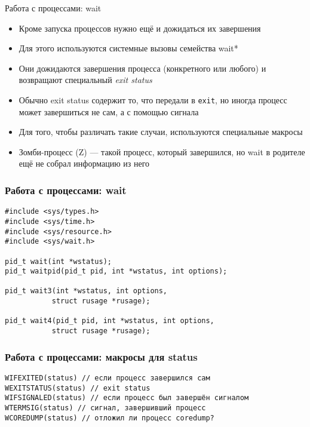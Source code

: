 \documentclass[10pt,pdf,hyperref={unicode}]{beamer}
\begin{document}
\begin{frame}{Работа с процессами: wait}
\begin{itemize}
    \item Кроме запуска процессов нужно ещё и дожидаться их завершения
    \item Для этого используются системные вызовы семейства wait*
    \item Они дожидаются завершения процесса (конкретного или любого) и возвращают специальный \emph{exit status}
    \item Обычно exit status содержит то, что передали в \texttt{exit}, но иногда процесс может завершиться не сам, а с помощью сигнала
    \item Для того, чтобы различать такие случаи, используются специальные макросы
    \item Зомби-процесс (Z) — такой процесс, который завершился, но wait в родителе ещё не собрал информацию из него
\end{itemize}
\end{frame}


\begin{frame}[fragile]
\frametitle{Работа с процессами: wait}
\begin{center}
\begin{minipage}{0.95\textwidth}
\begin{verbatim}
#include <sys/types.h>
#include <sys/time.h>
#include <sys/resource.h>
#include <sys/wait.h>

pid_t wait(int *wstatus);
pid_t waitpid(pid_t pid, int *wstatus, int options);

pid_t wait3(int *wstatus, int options,
           struct rusage *rusage);

pid_t wait4(pid_t pid, int *wstatus, int options,
           struct rusage *rusage);
\end{verbatim}
\end{minipage}
\end{center}
\end{frame}

\begin{frame}[fragile]
\frametitle{Работа с процессами: макросы для status}
\begin{center}
\begin{minipage}{0.95\textwidth}
\begin{verbatim}
WIFEXITED(status) // если процесс завершился сам
WEXITSTATUS(status) // exit status
WIFSIGNALED(status) // если процесс был завершён сигналом
WTERMSIG(status) // сигнал, завершивший процесс
WCOREDUMP(status) // отложил ли процесс coredump?

\end{verbatim}
\end{minipage}
\end{center}
\end{frame}
\end{document}
